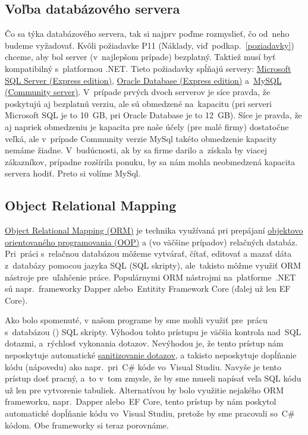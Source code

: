 \subsection{Voľba databázového servera}

Čo sa týka databázového servera, tak si najprv poďme rozmyslieť, čo od~neho budeme vyžadovať. Kvôli požiadavke P11 (Náklady, viď~podkap.~\ref{poziadavky}) chceme, aby bol server (v~najlepšom prípade) bezplatný. Taktiež musí byť kompatibilný s~platformou .NET. Tieto požiadavky spĺňajú servery: \href{https://www.microsoft.com/en-us/sql-server/sql-server-2022-comparison}{Microsoft SQL Server (Express edition)}, \href{https://www.oracle.com/database/technologies/appdev/xe.html}{Oracle Database (Express edition)} a~\href{https://dev.mysql.com/downloads/mysql/}{MySQL (Community server)}. V~prípade prvých dvoch serverov je síce pravda, že poskytujú aj bezplatnú verziu, ale sú obmedzené na~kapacitu (pri serveri Microsoft SQL je to 10~GB, pri Oracle Database je to 12~GB). Síce je pravda, že aj napriek obmedzeniu je kapacita pre naše účely (pre malé firmy) dostatočne veľká, ale v~prípade Community verzie MySql takéto obmedzenie kapacity nemáme žiadne. V~budúcnosti, ak by sa firme darilo a~získala by viacej zákazníkov, prípadne rozšírila ponuku, by sa nám mohla neobmedzená kapacita servera hodiť. Preto si volíme MySql.

\subsection{Object Relational Mapping}

\href{https://www.freecodecamp.org/news/what-is-an-orm-the-meaning-of-object-relational-mapping-database-tools/}{Object Relational Mapping (ORM)} je technika využívaná pri prepájaní \href{https://www.freecodecamp.org/news/four-pillars-of-object-oriented-programming/}{objektovo orientovaného programovania (OOP)} a (vo väčšine prípadov) relačných databáz. Pri~práci s~relačnou databázou môžeme vytvárať, čítať, editovať a mazať dáta z~databázy pomocou jazyka SQL (SQL skripty), ale~takisto môžme využiť ORM nástroje pre~uľahčenie práce. Populárnymi ORM nástrojmi na~platforme~.NET sú napr.~frameworky Dapper alebo~Entitity Framework Core (ďalej už len EF Core).

Ako bolo spomenuté, v našom programe by sme mohli využiť pre~prácu s~databázou () SQL skripty. Výhodou tohto prístupu je väčšia kontrola nad~SQL dotazmi, a~rýchlosť vykonania dotazov. Nevýhodou je, že tento prístup nám neposkytuje automatické \href{https://www.linkedin.com/advice/0/how-do-you-handle-user-input-validation-sanitization}{sanitizovanie dotazov}, a takisto neposkytuje dopĺňanie kódu (nápovedu) ako napr.~pri~C\# kóde vo~Visual Studiu. Navyše je tento prístup dosť pracný, a~to v~tom zmysle, že by sme museli napísať veľa SQL kódu už len pre vytvorenie tabuliek. Alternatívou by bolo využitie nejakého ORM frameworku, napr.~Dapper alebo~EF Core, tento prístup by nám poskytol automatické dopĺňanie kódu vo~Visual Studiu, pretože by sme pracovali so~C\# kódom. Obe frameworky si teraz porovnáme. 

